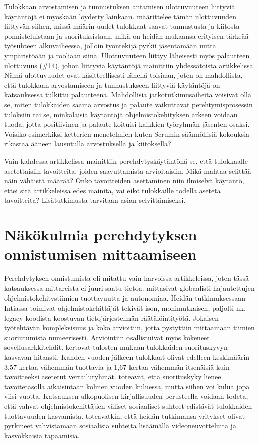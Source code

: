 \documentclass[utf8]{gradu3}
\begin{document}
Tulokkaan arvostamisen ja tunnustuksen antamisen ulottuvuuteen liittyviä käytäntöjä ei myöskään löydetty lainkaan. \textcite{wanberg-2012} määrittelee tämän ulottuvuuden liittyvän siihen, missä määrin uudet tulokkaat saavat tunnustusta ja kiitosta ponnisteluistaan ja suorituksistaan, mikä on heidän mukaansa erityisen tärkeää työsuhteen alkuvaiheessa, jolloin työntekijä pyrkii jäsentämään uutta ympäristöään ja rooliaan siinä. Ulottuvuuteen liittyy läheisesti myös palautteen ulottuvuus (\#14), johon liittyviä käytäntöjä mainittiin yhdessätoista artikkelissa. Nämä ulottuvuudet ovat käsitteellisesti lähellä toisiaan, joten on mahdollista, että tulokkaan arvostamiseen ja tunnustukseen liittyviä käytäntöjä on katsauksessa tulkittu palautteena. Mahdollisia jatkotutkimusaiheita voisivat olla se, miten tulokkaiden saama arvostus ja palaute vaikuttavat perehtymisprosessin tuloksiin tai se, minkälaisia käytäntöjä ohjelmistokehityksen arkeen voidaan tuoda, jotta positiivinen ja palaute koituisi kaikkien työryhmän jäsenten osaksi. Voisiko esimerkiksi ketterien menetelmien kuten Scrumin säännöllisiä kokouksia rikastaa ääneen lausutulla arvostuksella ja kiitoksella?

Vain kahdessa artikkelissa mainittiin perehdytyskäytäntönä se, että tulokkaalle asetettaisiin tavoitteita, joiden saavuttamista arvioitaisiin. Mikä mahtaa selittää näin vähäistä määrää? Onko tavoitteiden asettaminen niin ilmiselvä käytäntö, ettei sitä artikkeleissa edes mainita, vai eikö tulokkaille todella aseteta tavoitteita? Lisätutkimusta tarvitaan asian selvittämiseksi.

\section{Näkökulmia perehdytyksen onnistumisen mittaamiseen}
\label{luku-näkökulmia-perehdytyksen-onnistustumisen-mittaamiseen}

Perehdytyksen onnistumista oli mitattu vain harvoissa artikkeleissa, joten tässä katsauksessa mittareista ei juuri saatu tietoa. \textcite{britto-ym-2020} mittasivat globaalisti hajautettujen ohjelmistokehitystiimien tuottavuutta ja autonomiaa. Heidän tutkimuksessaan Intiassa toimivat ohjelmistokehittäjät tekivät ison, monimutkaisen, paljolti nk. legacy-koodista koostuvan tietojärjestelmän räätälöintityötä. Jokaisen työtehtävän kompleksisuus ja koko arvioitiin, jotta pystyttiin mittaamaan tiimien suoriutumista numeerisesti. Arviointiin osallistuivat myös kokeneet sovellusarkkitehdit. \textcite{britto-ym-2020} kertovat tulosten mukaan tulokkaiden suorituskyvyn kasvavan hitaasti. Kahden vuoden jälkeen tulokkaat olivat edelleen keskimäärin 3,57 kertaa vähemmän tuottavia ja 1,67 kertaa vähemmän itsenäisiä kuin tavoitteeksi asetetut vertailuryhmät. \textcite{britto-ym-2020} toteavat, että suorituskyky lienee tavoitetasolla aikaisintaan kolmen vuoden kuluessa, mutta siihen voi kulua jopa viisi vuotta. Katsauksen ulkopuolisen kirjallisuuden perusteella \parencite{casalnuovo-ym-2015} voidaan todeta, että vahvat ohjelmistokehittäjien väliset sosiaaliset suhteet edistävät tulokkaiden tuottavuuden kasvamista. \textcite{britto-ym-2020} toteavatkin, että heidän tutkimansa yritykset olivat pyrkineet vahvistamaan sosiaalisia suhteita lisäämällä videoneuvotteluita ja kasvokkaisia tapaamisia. 
\end{document}
